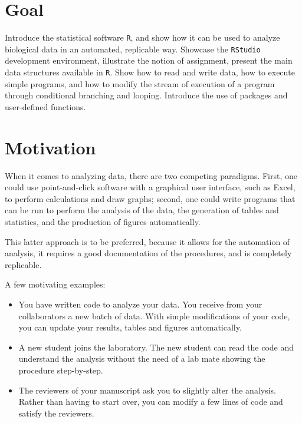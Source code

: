 \documentclass[
  letterpaper,
  DIV=11,
  numbers=noendperiod]{scrreprt}
\begin{document}

\section*{Goal}\label{goal}


Introduce the statistical software \texttt{R}, and show how it can be
used to analyze biological data in an automated, replicable way.
Showcase the \texttt{RStudio} development environment, illustrate the
notion of assignment, present the main data structures available in
\texttt{R}. Show how to read and write data, how to execute simple
programs, and how to modify the stream of execution of a program through
conditional branching and looping. Introduce the use of packages and
user-defined functions.

\section*{Motivation}\label{motivation}


When it comes to analyzing data, there are two competing paradigms.
First, one could use point-and-click software with a graphical user
interface, such as Excel, to perform calculations and draw graphs;
second, one could write programs that can be run to perform the analysis
of the data, the generation of tables and statistics, and the production
of figures automatically.

This latter approach is to be preferred, because it allows for the
automation of analysis, it requires a good documentation of the
procedures, and is completely replicable.

A few motivating examples:

\begin{itemize}
\item
  You have written code to analyze your data. You receive from your
  collaborators a new batch of data. With simple modifications of your
  code, you can update your results, tables and figures automatically.
\item
  A new student joins the laboratory. The new student can read the code
  and understand the analysis without the need of a lab mate showing the
  procedure step-by-step.
\item
  The reviewers of your manuscript ask you to slightly alter the
  analysis. Rather than having to start over, you can modify a few lines
  of code and satisfy the reviewers.
\end{itemize}
\end{document}
